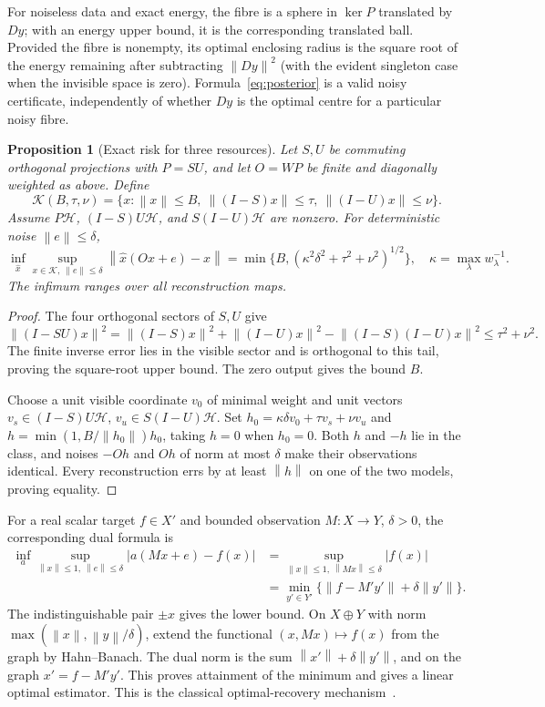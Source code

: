\documentclass[11pt,a4paper]{amsart}
\numberwithin{equation}{section}
\newtheorem{proposition}[theorem]{Proposition}
\theoremstyle{definition}
\theoremstyle{remark}
\newcommand{\norm}[1]{\left\lVert#1\right\rVert}
\begin{document}
For noiseless data and exact energy, the fibre is a sphere in $\ker P$ translated by $Dy$; with an energy upper bound, it is the corresponding translated ball. Provided the fibre is nonempty, its optimal enclosing radius is the square root of the energy remaining after subtracting $\norm{Dy}^2$ (with the evident singleton case when the invisible space is zero). Formula~\eqref{eq:posterior} is a valid noisy certificate, independently of whether $Dy$ is the optimal centre for a particular noisy fibre.

\begin{proposition}[Exact risk for three resources]\label{prop:threeresource}
Let $S,U$ be commuting orthogonal projections with $P=SU$, and let $O=WP$ be finite and diagonally weighted as above. Define
\[
 \mathcal K(B,\tau,\nu)=\{x:\norm x\le B,
      \ \norm{(I-S)x}\le\tau,\ \norm{(I-U)x}\le\nu\}.
\]
Assume $P\mathscr H$, $(I-S)U\mathscr H$, and $S(I-U)\mathscr H$ are nonzero. For deterministic noise $\norm e\le\delta$,
\begin{equation}\label{eq:threeresource}
 \inf_{\widehat x}\sup_{x\in\mathcal K,\ \norm e\le\delta}
 \norm{\widehat x(Ox+e)-x}
 =\min\{B,(\kappa^2\delta^2+\tau^2+\nu^2)^{1/2}\},
 \quad\kappa=\max_\lambda w_\lambda^{-1}.
\end{equation}
The infimum ranges over all reconstruction maps.
\end{proposition}
\begin{proof}
The four orthogonal sectors of $S,U$ give
\[
 \norm{(I-SU)x}^2
 =\norm{(I-S)x}^2+\norm{(I-U)x}^2
      -\norm{(I-S)(I-U)x}^2\le\tau^2+\nu^2.
\]
The finite inverse error lies in the visible sector and is orthogonal to this tail, proving the square-root upper bound. The zero output gives the bound $B$.

Choose a unit visible coordinate $v_0$ of minimal weight and unit vectors
$v_s\in(I-S)U\mathscr H$, $v_u\in S(I-U)\mathscr H$. Set
$h_0=\kappa\delta v_0+\tau v_s+\nu v_u$ and
$h=\min(1,B/\norm{h_0})h_0$, taking $h=0$ when $h_0=0$.
Both $h$ and $-h$ lie in the class, and noises $-Oh$ and $Oh$ of norm at most $\delta$ make their observations identical. Every reconstruction errs by at least $\norm h$ on one of the two models, proving equality.
\end{proof}

For a real scalar target $f\in X'$ and bounded observation $M:X\to Y$, $\delta>0$, the corresponding dual formula is
\begin{equation}\label{eq:scalar-minimax}
 \begin{split}
 \inf_a\sup_{\norm x\le1,\ \norm e\le\delta}|a(Mx+e)-f(x)|
 &=\sup_{\norm x\le1,\ \norm{Mx}\le\delta}|f(x)|\\
 &=\min_{y'\in Y'}\{\norm{f-M'y'}+\delta\norm{y'}\}.
 \end{split}
\end{equation}
The indistinguishable pair $\pm x$ gives the lower bound. On $X\oplus Y$ with norm $\max(\norm x,\norm y/\delta)$, extend the functional $(x,Mx)\mapsto f(x)$ from the graph by Hahn--Banach. The dual norm is the sum $\norm{x'}+\delta\norm{y'}$, and on the graph $x'=f-M'y'$. This proves attainment of the minimum and gives a linear optimal estimator. This is the classical optimal-recovery mechanism~\cite{MR,EF}.
\end{document}
